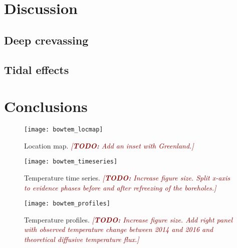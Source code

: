 \documentclass{article}
\newcommand{\todo}[1]{\textcolor{darkred}{\emph{[\textbf{TODO:} #1]}}}
\begin{document}
\section{Discussion}

\subsection{Deep crevassing}
\subsection{Tidal effects}

\section{Conclusions}


\clearpage

    \begin{figure}
      \centerline{\texttt{[image: bowtem\_locmap]}}
      \caption{Location map.
               \todo{Add an inset with Greenland.}}
      \label{fig:locmap}
    \end{figure}

    \begin{figure}
      \centerline{\texttt{[image: bowtem\_timeseries]}}
      \caption{Temperature time series.
               \todo{Increase figure size. Split x-axis to evidence phases
                     before and after refreezing of the boreholes.}}
      \label{fig:timeseries}
    \end{figure}

    \begin{figure}
      \centerline{\texttt{[image: bowtem\_profiles]}}
      \caption{Temperature profiles.
               \todo{Increase figure size. Add right panel with observed
                     temperature change between 2014 and 2016 and theoretical
                     diffusive temperature flux.}}
      \label{fig:profiles}
    \end{figure}


\end{document}
